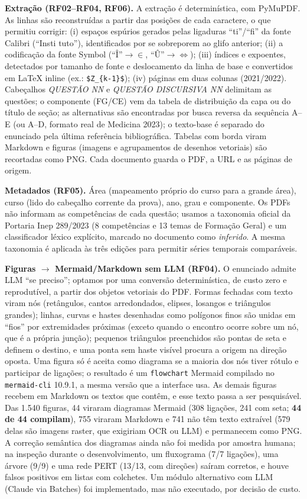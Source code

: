 \documentclass[12pt]{article}
\newcommand{\cod}[1]{\texttt{\small #1}}
\begin{document}
\textbf{Extração (RF02--RF04, RF06).} A extração é determinística, com PyMuPDF. As linhas são reconstruídas a
partir das posições de cada caractere, o que permitiu corrigir: (i) espaços espúrios gerados pelas ligaduras
``ti''/``fi'' da fonte Calibri (``Insti tuto''), identificados por se sobreporem ao glifo anterior; (ii) a
codificação da fonte Symbol (``Î''$\to\in$, ``Û''$\to\Leftrightarrow$); (iii) índices e expoentes, detectados por
tamanho de fonte e deslocamento da linha de base e convertidos em LaTeX inline (ex.: \cod{\$Z\_\{k-1\}\$});
(iv) páginas em duas colunas (2021/2022). Cabeçalhos \textit{QUESTÃO NN} e \textit{QUESTÃO DISCURSIVA NN}
delimitam as questões; o componente (FG/CE) vem da tabela de distribuição da capa ou do título de seção; as
alternativas são encontradas por busca reversa da sequência A--E (ou A--D, formato real de Medicina 2023);
o texto-base é separado do enunciado pela última referência bibliográfica. Tabelas com borda viram Markdown e
figuras (imagens e agrupamentos de desenhos vetoriais) são recortadas como PNG. Cada documento guarda o PDF, a
URL e as páginas de origem.

\textbf{Metadados (RF05).} Área (mapeamento próprio do curso para a grande área), curso (lido do cabeçalho
corrente da prova), ano, grau e componente. Os PDFs não informam as competências de cada questão; usamos a
taxonomia oficial da Portaria Inep 289/2023 (8 competências e 13 temas de Formação Geral)
\cite{inep2023portaria289} e um classificador léxico explícito, marcado no documento como \textit{inferido}.
A mesma taxonomia é aplicada às três edições para permitir séries temporais comparáveis.

\textbf{Figuras $\to$ Mermaid/Markdown sem LLM (RF04).} O enunciado admite LLM ``se preciso''; optamos por uma
conversão determinística, de custo zero e reprodutível, a partir dos objetos vetoriais do PDF. Formas fechadas com
texto viram nós (retângulos, cantos arredondados, elipses, losangos e triângulos grandes); linhas, curvas e
hastes desenhadas como polígonos finos são unidas em ``fios'' por extremidades próximas (exceto quando o encontro
ocorre sobre um nó, que é a própria junção); pequenos triângulos preenchidos são pontas de seta e definem o destino,
e uma ponta sem haste visível procura a origem na direção oposta. Uma figura só é aceita como diagrama se a maioria
dos nós tiver rótulo e participar de ligações; o resultado é um \cod{flowchart} Mermaid compilado no
\cod{mermaid-cli} 10.9.1, a mesma versão que a interface usa. As demais figuras recebem em Markdown os textos que
contêm, e esse texto passa a ser pesquisável. Das 1.540 figuras, 44 viraram diagramas Mermaid (308 ligações,
241 com seta; \textbf{44 de 44 compilam}), 755 viraram Markdown e 741 não têm texto extraível (579 delas são
imagens raster, que exigiriam OCR ou LLM) e permanecem como PNG. A correção semântica dos diagramas ainda não foi
medida por amostra humana; na inspeção durante o desenvolvimento, um fluxograma (7/7 ligações), uma árvore (9/9) e
uma rede PERT (13/13, com direções) saíram corretos, e houve falsos positivos em listas com colchetes. Um módulo
alternativo com LLM (Claude via Batches) foi implementado, mas não executado, por decisão de custo.
\end{document}

